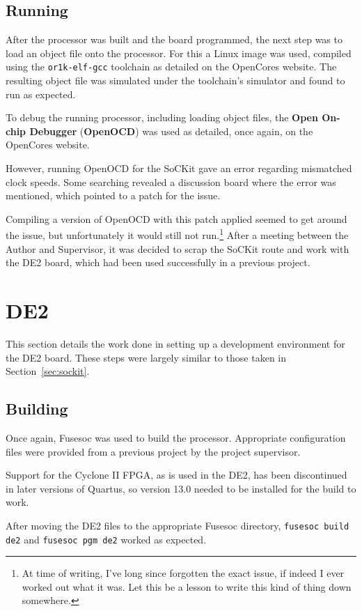 \subsection{Running}
After the processor was built and the board programmed, the next step was to load an object file onto the processor. For this a Linux image was used, compiled using the \texttt{or1k-elf-gcc} toolchain as detailed on the OpenCores website\cite{or1k-linux}. The resulting object file was simulated under the toolchain's simulator and found to run as expected.

To debug the running processor, including loading object files, the \textbf{Open On-chip Debugger} (\textbf{OpenOCD}) was used as detailed, once again, on the OpenCores website\cite{or1k-openocd}.

However, running OpenOCD for the SoCKit gave an error regarding mismatched clock speeds. Some searching revealed a discussion board\cite{openocd-sockit} where the error was mentioned, which pointed to a patch for the issue\cite{openocd-fix}.

Compiling a version of OpenOCD with this patch applied seemed to get around the issue, but unfortunately it would still not run.\footnote{At time of writing, I've long since forgotten the exact issue, if indeed I ever worked out what it was. Let this be a lesson to write this kind of thing down somewhere.} After a meeting between the Author and Supervisor, it was decided to scrap the SoCKit route and work with the DE2 board, which had been used successfully in a previous project.

\section{DE2}
This section details the work done in setting up a development environment for the DE2 board. These steps were largely similar to those taken in Section~\ref{sec:sockit}.

\subsection{Building}
Once again, Fusesoc was used to build the processor. Appropriate configuration files were provided from a previous project by the project supervisor.

Support for the Cyclone II FPGA, as is used in the DE2, has been discontinued in later versions of Quartus, so version 13.0 needed to be installed for the build to work.

After moving the DE2 files to the appropriate Fusesoc directory, \texttt{fusesoc build de2} and \texttt{fusesoc pgm de2} worked as expected.

